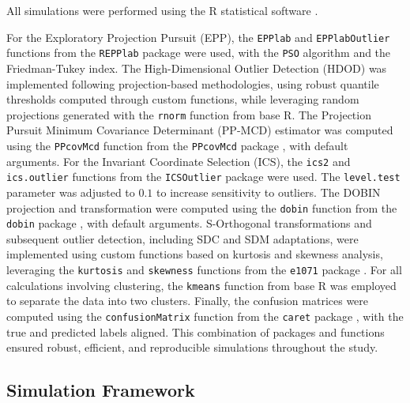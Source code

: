 \documentclass[12pt]{article}
\begin{document}
All simulations were performed using the R statistical software \citep{R2024}. 

For the Exploratory Projection Pursuit (EPP), the \texttt{EPPlab} and \texttt{EPPlabOutlier} functions from the \texttt{REPPlab} package \citep{R-REPPlab} were used, with the \texttt{PSO} algorithm and the Friedman-Tukey index. The High-Dimensional Outlier Detection (HDOD) was implemented following projection-based methodologies, using robust quantile thresholds computed through custom functions, while leveraging random projections generated with the \texttt{rnorm} function from base R. The Projection Pursuit Minimum Covariance Determinant (PP-MCD) estimator was computed using the \texttt{PPcovMcd} function from the \texttt{PPcovMcd} package \citep{R-PPcovMcd}, with default arguments. For the Invariant Coordinate Selection (ICS), the \texttt{ics2} and \texttt{ics.outlier} functions from the \texttt{ICSOutlier} package \citep{R-ICSOutlier} were used. The \texttt{level.test} parameter was adjusted to $0.1$ to increase sensitivity to outliers. The DOBIN projection and transformation were computed using the \texttt{dobin} function from the \texttt{dobin} package \citep{R-dobin}, with default arguments. S-Orthogonal transformations and subsequent outlier detection, including SDC and SDM adaptations, were implemented using custom functions based on kurtosis and skewness analysis, leveraging the \texttt{kurtosis} and \texttt{skewness} functions from the \texttt{e1071} package \citep{R-e1071}. For all calculations involving clustering, the \texttt{kmeans} function from base R was employed to separate the data into two clusters. Finally, the confusion matrices were computed using the \texttt{confusionMatrix} function from the \texttt{caret} package \citep{R-caret}, with the true and predicted labels aligned. This combination of packages and functions ensured robust, efficient, and reproducible simulations throughout the study.



\subsection{Simulation Framework}
\end{document}
